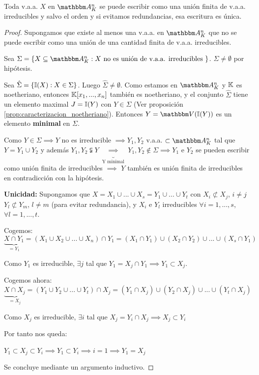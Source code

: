 \begin{theorem}
	Toda v.a.a. $X$ en $\Akn$ se puede escribir como una unión finita de v.a.a. irreducibles y salvo el orden y si evitamos redundancias, esa escritura es única.
\end{theorem}

\begin{proof}
	Supongamos que existe al menos una v.a.a. en $\Akn$ que no se puede escribir como una unión de una cantidad finita de v.a.a. irreducibles.

	Sea $\Sigma=\{ X \subseteq \Akn: X \text{ no es unión de v.a.a. irreducibles }\}$. $\Sigma \neq \emptyset$ por hipótesis.

	Sea $\hat{\Sigma}=\{\mathbb{I}(X): X \in \Sigma\}$. Luego $\hat{\Sigma} \neq \emptyset$. Como estamos en $\Akn$ y $\mathbb{K}$ es noetheriano, entonces $\mathbb{K}[x_1,...,x_n]$ también es noetheriano, y el conjunto $\hat{\Sigma}$ tiene un elemento maximal $J=\mathbb{I}(Y)$ con $Y \in \Sigma$ (Ver proposición \ref{prop:caracterizacion_noetheriano}). Entonces $Y=\V(\I(Y))$ es un elemento \textbf{minimal} en $\Sigma$.

	Como $Y \in \Sigma \implies Y$ no es irreducible $\implies Y_1,Y_2$ v.a.a. $\subset \Akn$ tal que $Y=Y_1 \cup Y_2$ y además $Y_1,Y_2 \subsetneqq Y \underbrace{\implies}_{\text{ Y minimal }} Y_1, Y_2 \notin \Sigma \implies  Y_1$ e $Y_2$ se pueden escribir como unión finita de irreducibles $\implies$ $Y$ también es unión finita de irreducibles en contradicción con la hipótesis.

	\textbf{Unicidad:} Supongamos que $X=X_1\cup...\cup X_s=Y_1 \cup...\cup Y_t$ con $X_i \not \subset X_j$,  $i \neq j$ $Y_l \not \subset Y_m$, $l \neq m$ (para evitar redundancia),  y $X_i$ e $Y_l$ irreducibles $\forall i=1,...,s$, $\forall l=1,...,t$.

	Cogemos:
	$$ \underbrace{X\cap Y_1}_{=Y_1}=(X_1 \cup X_2 \cup ... \cup X_n) \cap Y_1 = (X_1 \cap Y_1) \cup (X_2 \cap Y_2) \cup ... \cup (X_s \cap Y_1)$$

	Como $Y_1$ es irreducible, $\exists j$ tal que $Y_1=X_j \cap Y_1 \implies Y_1 \subset X_j$.

	Cogemos ahora:
	$$ \underbrace{X \cap X_j}_{= X_j} = (Y_1 \cup Y_2 \cup ... \cup Y_t) \cap X_j = (Y_1 \cap X_j) \cup (Y_2 \cap X_j) \cup ... \cup (Y_t \cap X_j)$$

	Como $X_j$ es irreducible, $\exists i$ tal que $X_j=Y_i \cap X_j \implies X_j \subset Y_i$

	Por tanto nos queda:

	$Y_1 \subset X_j \subset Y_i \implies Y_1 \subset Y_i \implies i=1 \implies Y_1 = X_j$

	Se concluye mediante un argumento inductivo.
\end{proof}

